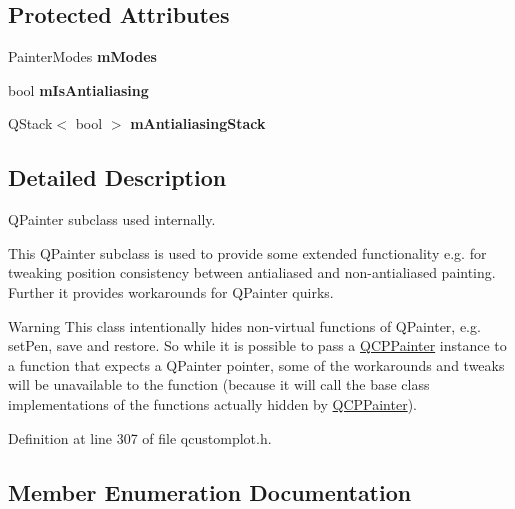 \subsection*{Protected Attributes}
\begin{DoxyCompactItemize}
\item 
\mbox{\label{class_q_c_p_painter_af5d1d6e5df0adbc7de5633250fb3396c}} 
Painter\+Modes {\bfseries m\+Modes}
\item 
\mbox{\label{class_q_c_p_painter_a7055085da176aee0f6b23298f1003d08}} 
bool {\bfseries m\+Is\+Antialiasing}
\item 
\mbox{\label{class_q_c_p_painter_a0189e641bbf7dc31ac15aef7b36501fa}} 
Q\+Stack$<$ bool $>$ {\bfseries m\+Antialiasing\+Stack}
\end{DoxyCompactItemize}


\subsection{Detailed Description}
Q\+Painter subclass used internally. 

This Q\+Painter subclass is used to provide some extended functionality e.\+g. for tweaking position consistency between antialiased and non-\/antialiased painting. Further it provides workarounds for Q\+Painter quirks.

\begin{DoxyWarning}{Warning}
This class intentionally hides non-\/virtual functions of Q\+Painter, e.\+g. set\+Pen, save and restore. So while it is possible to pass a \hyperlink{class_q_c_p_painter}{Q\+C\+P\+Painter} instance to a function that expects a Q\+Painter pointer, some of the workarounds and tweaks will be unavailable to the function (because it will call the base class implementations of the functions actually hidden by \hyperlink{class_q_c_p_painter}{Q\+C\+P\+Painter}). 
\end{DoxyWarning}


Definition at line 307 of file qcustomplot.\+h.



\subsection{Member Enumeration Documentation}
\mbox{\label{class_q_c_p_painter_a156cf16444ff5e0d81a73c615fdb156d}} 
